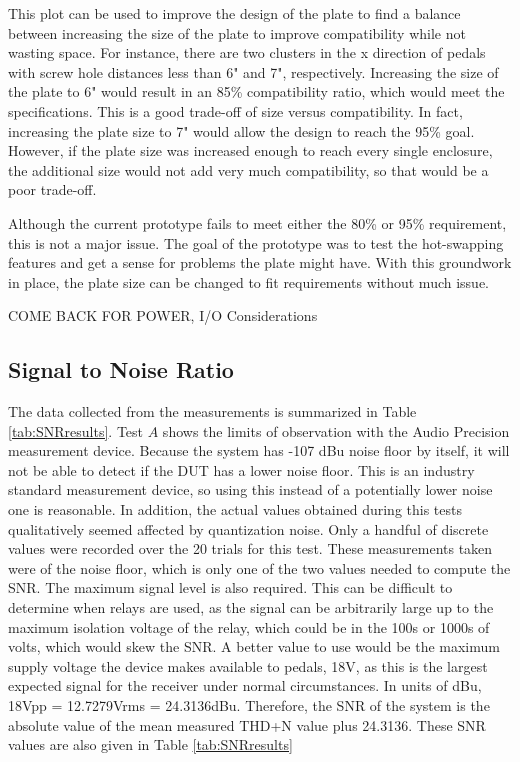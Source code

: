 \documentclass{article}
\begin{document}
	This plot can be used to improve the design of the plate to find a balance between increasing the size of the plate to improve compatibility while not wasting space.  For instance, there are two clusters in the x direction of pedals with screw hole distances less than 6" and 7", respectively.  Increasing the size of the plate to 6" would result in an 85\% compatibility ratio, which would meet the specifications.  This is a good trade-off of size versus compatibility.  In fact, increasing the plate size to 7" would allow the design to reach the 95\% goal.  However, if the plate size was increased enough to reach every single enclosure, the additional size would not add very much compatibility, so that would be a poor trade-off.

	Although the current prototype fails to meet either the 80\% or 95\% requirement, this is not a major issue.  The goal of the prototype was to test the hot-swapping features and get a sense for problems the plate might have.  With this groundwork in place, the plate size can be changed to fit requirements without much issue.

	COME BACK FOR POWER, I/O Considerations

	\subsection{Signal to Noise Ratio}
	The data collected from the measurements is summarized in Table \ref{tab:SNRresults}.  Test $A$ shows the limits of observation with the Audio Precision measurement device.  Because the system has -107 dBu noise floor by itself, it will not be able to detect if the DUT has a lower noise floor.  This is an industry standard measurement device, so using this instead of a potentially lower noise one is reasonable.  In addition, the actual values obtained during this tests qualitatively seemed affected by quantization noise.  Only a handful of discrete values were recorded over the 20 trials for this test.  These measurements taken were of the noise floor, which is only one of the two values needed to compute the SNR.  The maximum signal level is also required.  This can be difficult to determine when relays are used, as the signal can be arbitrarily large up to the maximum isolation voltage of the relay, which could be in the 100s or 1000s of volts, which would skew the SNR.  A better value to use would be the maximum supply voltage the device makes available to pedals, 18V, as this is the largest expected signal for the receiver under normal circumstances.  In units of dBu, 18Vpp = 12.7279Vrms = 24.3136dBu.  Therefore, the SNR of the system is the absolute value of the mean measured THD+N value plus 24.3136.  These SNR values are also given in Table \ref{tab:SNRresults}
\end{document}
